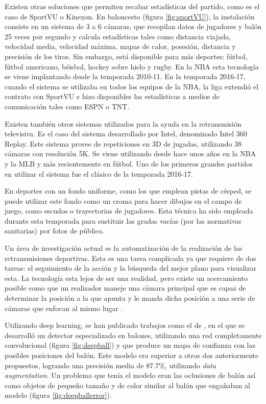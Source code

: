 Existen otras soluciones que permiten recabar estadísticas del partido, como es el caso de SportVU o Kinexon. En baloncesto (figura \ref{fig:sportVU}), la instalación consiste en un sistema de 3 a 6 cámaras, que recopilan datos de jugadores y balón 25 veces por segundo y calcula estadísticas tales como distancia viajada, velocidad media, velocidad máxima, mapas de calor, posesión, distancia y precisión de los tiros. Sin embargo, está disponible para más deportes: fútbol, fútbol americano, béisbol, hockey sobre hielo y rugby. En la NBA esta tecnología se viene implantando desde la temporada 2010-11. En la temporada 2016-17, cuando el sistema se utilizaba en todos los equipos de la NBA, la liga extendió el contrato con SportVU e hizo disponibles las estadísticas a medios de comunicación tales como ESPN o TNT.

Existen también otros sistemas utilizados para la ayuda en la retransmisión televisiva. Es el caso del sistema desarrollado por Intel, denominado Intel 360 Replay. Este sistema provee de repeticiones en 3D de jugadas, utilizando 38 cámaras con resolución 5K. Se viene utilizando desde hace unos años en la NBA y la MLB y más recientemente en fútbol. Uno de los primeros grandes partidos en utilizar el sistema fue el clásico de la temporada 2016-17.

En deportes con un fondo uniforme, como los que emplean pistas de césped, se puede utilizar este fondo como un croma para hacer dibujos en el campo de juego, como escudos o trayectorias de jugadores. Esta técnica ha sido empleada durante esta temporada para sustituir las gradas vacías (por las normativas sanitarias) por fotos de público.

Un área de investigación actual es la automatización de la realización de las retransmisiones deportivas. Esta es una tarea complicada ya que requiere de dos tareas: el seguimiento de la acción y la búsqueda del mejor plano para visualizar esta. La tecnología esta lejos de ser una realidad, pero existe un acercamiento posible como que un realizador maneje una cámara principal que es capaz de determinar la posición a la que apunta y le manda dicha posición a una serie de cámaras que enfocan al mismo lugar \cite{book:cvInSports}.

Utilizando deep learning, se han publicado trabajos como el de \citet{art:DeepBall}, en el que se desarrolló un detector especializado en balones, utilizando una red completamente convolucional (figura \ref{fig:deepball}) y que produce un mapa de confianza con las posibles posiciones del balón. Este modelo era superior a otros dos anteriormente propuestos, logrando una precisión media de $87.7\%$, utilizando \textit{data augmentation}. Un problema que tenía el modelo eran las oclusiones de balón así como objetos de pequeño tamaño y de color similar al balón que engañaban al modelo (figura \ref{fig:deepballerror}).

